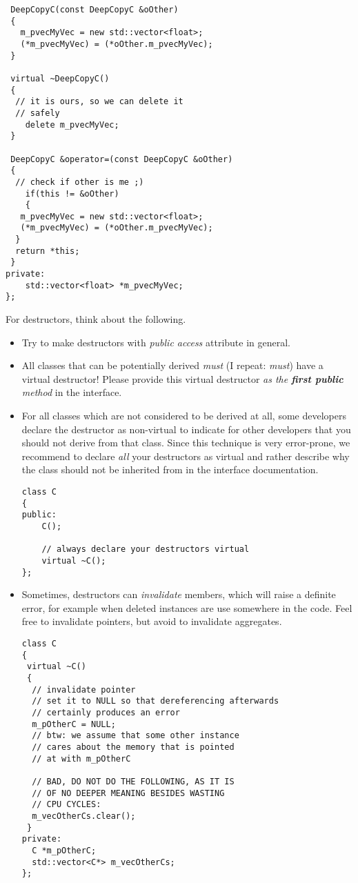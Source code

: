 \begin{itemize}
\begin{verbatim}
 DeepCopyC(const DeepCopyC &oOther)
 {
   m_pvecMyVec = new std::vector<float>;
   (*m_pvecMyVec) = (*oOther.m_pvecMyVec);
 }
 
 virtual ~DeepCopyC()
 {
  // it is ours, so we can delete it
  // safely
 	delete m_pvecMyVec;
 }
 
 DeepCopyC &operator=(const DeepCopyC &oOther)
 {
  // check if other is me ;)
 	if(this != &oOther)
 	{
   m_pvecMyVec = new std::vector<float>;
   (*m_pvecMyVec) = (*oOther.m_pvecMyVec);
  }
  return *this;		
 }
private:
	std::vector<float> *m_pvecMyVec;
};
\end{verbatim}
\end{itemize}
For destructors, think about the following.
\begin{itemize}
\item Try to make destructors with \emph{public access} attribute in general.
\item All classes that can be potentially derived \emph{must} (I repeat: \emph{must}) have a virtual destructor!
Please provide this virtual destructor \emph{as the \textbf{first public} method} in the interface.
\item For all classes which are not considered to be derived at all, some developers declare the destructor as non-virtual to indicate for other developers that you should not derive from that class.
Since this technique is very error-prone, we recommend to declare \emph{all} your destructors as virtual and rather describe why the class should not be inherited from in the interface documentation.

\begin{verbatim}
class C
{
public:
	C();
	
	// always declare your destructors virtual
	virtual ~C();
};
\end{verbatim}
\item Sometimes, destructors can \emph{invalidate} members, which will raise a definite error, for example when deleted instances are use somewhere in the code.
Feel free to invalidate pointers, but avoid to invalidate aggregates.
\begin{verbatim}
class C
{
 virtual ~C()
 {
  // invalidate pointer
  // set it to NULL so that dereferencing afterwards
  // certainly produces an error
  m_pOtherC = NULL; 
  // btw: we assume that some other instance
  // cares about the memory that is pointed
  // at with m_pOtherC
  
  // BAD, DO NOT DO THE FOLLOWING, AS IT IS
  // OF NO DEEPER MEANING BESIDES WASTING
  // CPU CYCLES:
  m_vecOtherCs.clear();
 }
private:
  C *m_pOtherC;
  std::vector<C*> m_vecOtherCs;
};

\end{verbatim}
\end{itemize}


